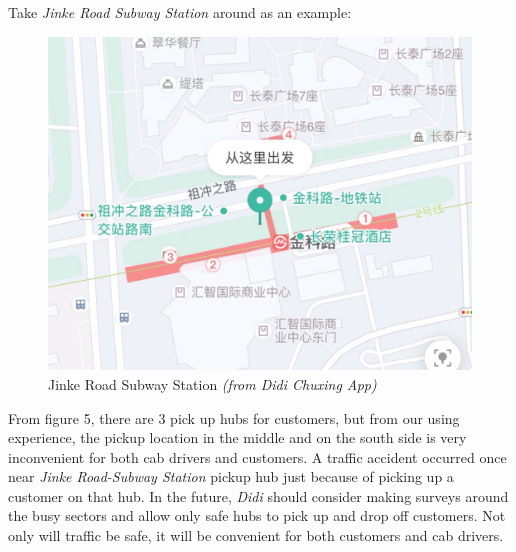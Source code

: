\documentclass{article}
\begin{document}
\qquad Take \emph{Jinke Road Subway Station} around as an example:
\begin{figure}[htbp]
	\centering
	\includegraphics[width = 35em]{JinkeRoad.jpg}
	\caption{Jinke Road Subway Station \emph{(from Didi Chuxing App)}}
\end{figure}

From figure 5, there are 3 pick up hubs for customers, but from our using experience, the pickup location in the middle and on the south side is very inconvenient for both cab drivers and customers. A traffic accident occurred once near \emph{Jinke Road-Subway Station} pickup hub just because of picking up a customer on that hub. In the future, \emph{Didi} should consider making surveys around the busy sectors and allow only safe hubs to pick up and drop off customers. Not only will traffic be safe, it will be convenient for both customers and cab drivers.

\clearpage


\end{document}
